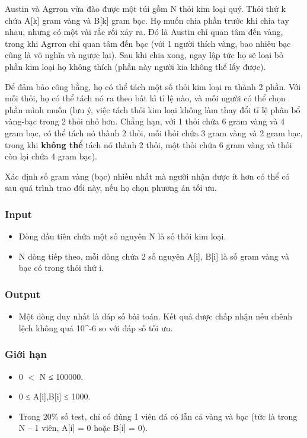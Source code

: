 



   Austin và Agrron vừa đào được một túi gồm N thỏi kim loại quý. Thỏi thứ k chứa A[k] gram vàng và B[k] gram bạc. Họ muốn chia phần trước khi chia tay nhau, nhưng có một vài rắc rối xảy ra. Đó là Austin chỉ quan tâm đến vàng, trong khi Agrron chỉ quan tâm đến bạc (với 1 người thích vàng, bao nhiêu bạc cũng là vô nghĩa và ngược lại). Sau khi chia xong, ngay lập tức họ sẽ loại bỏ phần kim loại họ không thích (phần này người kia không thể lấy được).  



   Để đảm bảo công bằng, họ có thể tách một số thỏi kim loại ra thành 2 phần. Với mỗi thỏi, họ có thể tách nó ra theo bất kì tỉ lệ nào, và mỗi người có thể chọn phần mình muốn (lưu ý, việc tách thỏi kim loại không làm thay đổi tỉ lệ phân bổ vàng-bạc trong 2 thỏi nhỏ hơn. Chẳng hạn, với 1 thỏi chứa 6 gram vàng và 4 gram bạc, có thể tách nó thành 2 thỏi, mỗi thỏi chứa 3 gram vàng và 2 gram bạc, trong khi   \textbf{    không thể   }   tách nó thành 2 thỏi, một thỏi chứa 6 gram vàng và thỏi còn lại chứa 4 gram bạc).  



   Xác định số gram vàng (bạc) nhiều nhất mà người nhận được ít hơn có thể có sau quá trình trao đổi này, nếu họ chọn phương án tối ưu.  

\subsubsection{   Input  }
\begin{itemize}
	\item     Dòng đầu tiên chứa một số nguyên N là số thỏi kim loại.   
	\item     N dòng tiếp theo, mỗi dòng chứa 2 số nguyên A[i], B[i] là số gram vàng và bạc có trong thỏi thứ i.   
\end{itemize}



\subsubsection{   Output  }
\begin{itemize}
	\item     Một dòng duy nhất là đáp số bài toán. Kết quả được chấp nhận nếu chênh lệch không quá 10^-6 so với đáp số tối ưu.   
\end{itemize}



\subsubsection{   Giới hạn  }
\begin{itemize}
	\item     0 $<$ N ≤ 100000.   
	\item     0 ≤ A[i],B[i] ≤ 1000.   
	\item     Trong 20\% số test, chỉ có đúng 1 viên đá có lẫn cả vàng và bạc (tức là trong N – 1 viên, A[i] = 0 hoặc B[i] = 0).   
\end{itemize}

